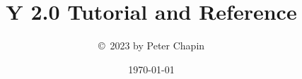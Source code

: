 \documentclass{report}
\begin{document}
\newcommand{\filename}[1]{\texttt{#1}}
\newcommand{\press}[1]{\texttt{#1}}

\title{Y 2.0 Tutorial and Reference}
\author{\copyright\ 2023 by Peter Chapin}
\date{\today}
\maketitle

\tableofcontents
\newpage
{}










\end{document}

